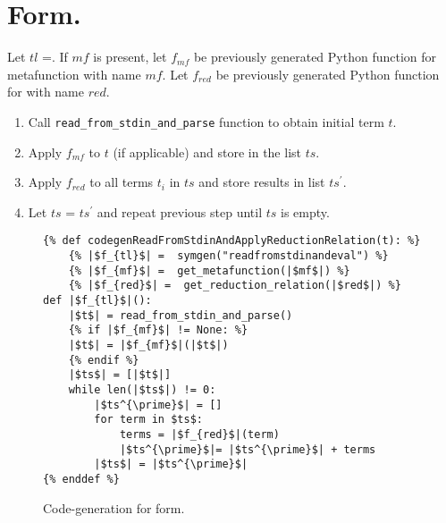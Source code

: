 \section{\ReadFromStdinAndApplyReductionRelationNoArgs \space Form.}

Let $tl$ =\ReadFromStdinAndApplyReductionRelation. If $mf$ is present, let $f_{mf}$ be previously generated Python function for metafunction with name $mf$. Let $f_{red}$ be previously generated Python function for \RedexMatchAssertEqualNoArgs \space with name $red$. 

\begin{enumerate}
\item Call \texttt{read\_from\_stdin\_and\_parse} function to obtain initial term $t$.
\item Apply $f_{mf}$ to $t$ (if applicable) and store in the list $ts$.
\item Apply $f_{red}$ to all terms $t_i$ in $ts$ and store results in list $ts^{\prime}$.
\item Let $ts$ = $ts^{\prime}$ and repeat previous step until $ts$ is empty.
\end{enumerate}

\begin{figure}
\begin{verbatim}
{% def codegenReadFromStdinAndApplyReductionRelation(t): %}
	{% |$f_{tl}$| =  symgen("readfromstdinandeval") %}
	{% |$f_{mf}$| =  get_metafunction(|$mf$|) %}
	{% |$f_{red}$| =  get_reduction_relation(|$red$|) %}
def |$f_{tl}$|():
	|$t$| = read_from_stdin_and_parse()
	{% if |$f_{mf}$| != None: %}
	|$t$| = |$f_{mf}$|(|$t$|)
	{% endif %}
    |$ts$| = [|$t$|]
    while len(|$ts$|) != 0:
        |$ts^{\prime}$| = []
        for term in $ts$:
            terms = |$f_{red}$|(term)
            |$ts^{\prime}$|= |$ts^{\prime}$| + terms 
        |$ts$| = |$ts^{\prime}$|
{% enddef %}
\end{verbatim}
\caption{Code-generation for \ReadFromStdinAndApplyReductionRelationNoArgs form.}
\label{codegen-repl}
\end{figure}
